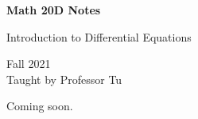 \documentclass[letterpaper]{article}
\begin{document}
\begin{titlepage}
    \begin{center}
        \vspace*{1cm}
            
        \Huge
        \textbf{Math 20D Notes}
            
        \vspace{0.5cm}
        \LARGE
        Introduction to Differential Equations
            
        \vspace{1.5cm}
            
        \vfill
            
        Fall 2021\\
        Taught by Professor Tu
    \end{center}
\end{titlepage}


\newpage 

\begingroup
    \renewcommand\contentsname{Table of Contents}
    \tableofcontents
\endgroup

\newpage
{}

Coming soon. 
\end{document}
